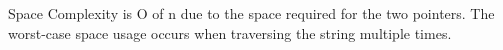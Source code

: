 \documentclass[preview]{standalone}
\begin{document}
Space Complexity is O of n due to the space required for the two pointers. The worst-case space usage occurs when traversing the string multiple times.\\
\end{document}
